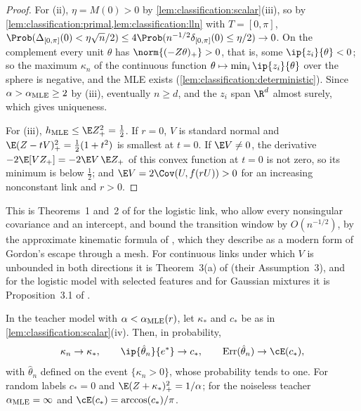 \begin{refsection}
\begin{proof}
For (ii), $\eta=M(0)>0$ by \cref{lem:classification:scalar}(iii), so by \cref{lem:classification:primal,lem:classification:lln} with $T=[0,\pi]$, $\Prob(\Delta_{[0,\pi]}(0)<\eta\sqrt n/2)\le4\Prob(n^{-1/2}\delta_{[0,\pi]}(0)\le\eta/2)\to0$. On the complement every unit $\theta$ has $\norm{(-Z\theta)_+}>0$, that is, some $\ip{z_i}{\theta}<0$; so the maximum $\kappa_n$ of the continuous function $\theta\mapsto\min_i\ip{z_i}{\theta}$ over the sphere is negative, and the MLE exists (\cref{lem:classification:deterministic}). Since $\alpha>\alpha_{\mathrm{MLE}}\ge2$ by (iii), eventually $n\ge d$, and the $z_i$ span $\R^d$ almost surely, which gives uniqueness.

For (iii), $\classificationh\le\E Z_+^2=\frac12$. If $r=0$, $V$ is standard normal and $\E(Z-tV)_+^2=\frac12(1+t^2)$ is smallest at $t=0$. If $\E V\ne0$, the derivative $-2\E[VZ_+]=-2\E V\,\E Z_+$ of this convex function at $t=0$ is not zero, so its minimum is below $\frac12$; and $\E V=2\Cov(U,f(rU))>0$ for an increasing nonconstant link and $r>0$.
\end{proof}

This is Theorems~1 and~2 of \textcite{CandesSur2020} for the logistic link, who allow every nonsingular covariance and an intercept, and bound the transition window by $O(n^{-1/2})$, by the approximate kinematic formula of \textcite{AmelunxenEtAl2014}, which they describe as a modern form of Gordon's escape through a mesh. For continuous links under which $V$ is unbounded in both directions it is Theorem~3(a) of \textcite{MontanariEtAl2025} (their Assumption~3), and for the logistic model with selected features and for Gaussian mixtures it is Proposition~3.1 of \textcite{DengKammounThrampoulidis2022}.

\begin{theorem}\label{thm:classification:margin}
In the teacher model with $\alpha<\alpha_{\mathrm{MLE}}(r)$, let $\kappa_*$ and $c_*$ be as in \cref{lem:classification:scalar}(iv). Then, in probability,
\[
\kappa_n\to\kappa_*,\qquad\ip{\hat\theta_n}{e^*}\to c_*,\qquad\classificationerr(\hat\theta_n)\to\cE(c_*),
\]
with $\hat\theta_n$ defined on the event $\{\kappa_n>0\}$, whose probability tends to one. For random labels $c_*=0$ and $\E(Z+\kappa_*)_+^2=1/\alpha$; for the noiseless teacher $\alpha_{\mathrm{MLE}}=\infty$ and $\cE(c_*)=\arccos(c_*)/\pi$.
\end{theorem}


\end{refsection}
